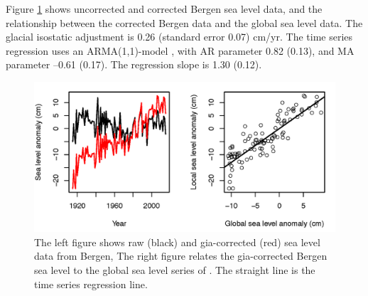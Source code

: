 \documentclass[draft,linenumbers]{agujournal}
\begin{document}
Figure \ref{fig:bergenobs} shows uncorrected and corrected Bergen sea level data, and the relationship between the corrected Bergen data and the global sea level data. The glacial isostatic adjustment is 0.26 (standard error 0.07) cm/yr. The time series regression uses an ARMA(1,1)-model \citep{boxjenkins}, with AR parameter 0.82 (0.13), and MA parameter --0.61 (0.17). The regression slope is 1.30 (0.12).

\begin{figure}[!hbpt]
\begin{center}
\includegraphics[width=0.75\linewidth]{bergenfit_edit.png}
\caption{ The left figure shows raw (black) and gia-corrected (red) sea level data from Bergen, The right figure relates the gia-corrected Bergen sea level to the global sea level series of \citet{csiro}. The straight line is the time series regression line.}
\label{fig:bergenobs}
\end{center}
\end{figure}
\end{document}
